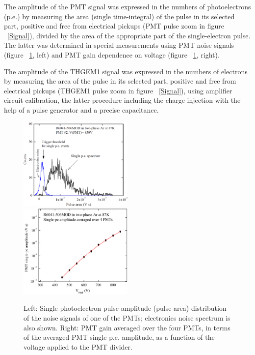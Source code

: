 \documentclass[a4paper,11pt]{article}
\begin{document}
The amplitude of the PMT signal was expressed in the numbers of photoelectrons (p.e.) by measuring the area (single time-integral) of the pulse in its selected part, positive and free from electrical pickups (PMT pulse zoom in figure ~\ref{Signal}), divided by the area of the appropriate part of the single-electron pulse. The latter was determined in special measurements using PMT noise signals (figure ~\ref{APMT}, left) and PMT gain dependence on voltage (figure ~\ref{APMT}, right).

The amplitude of the THGEM1 signal was expressed in the numbers of electrons by measuring the area of the pulse in its selected part, positive and free from electrical pickups (THGEM1 pulse zoom in figure ~\ref{Signal}), using  amplifier circuit calibration, the latter procedure including the charge injection with the help of a pulse generator and a precise capacitance.


\begin{figure}[ht]
	\includegraphics[width=0.5\textwidth]{fig4a}
	\hfill
	\includegraphics[width=0.5\textwidth]{fig4b}
	\caption{Left: Single-photoelectron pulse-amplitude (pulse-area) distribution of the noise signals of one of the PMTs; electronics noise spectrum is also shown. Right: PMT gain averaged over the four PMTs, in terms of the averaged PMT single p.e. amplitude, as a function of the voltage applied to the PMT divider.}
	\label{APMT}
\end{figure}
\end{document}
